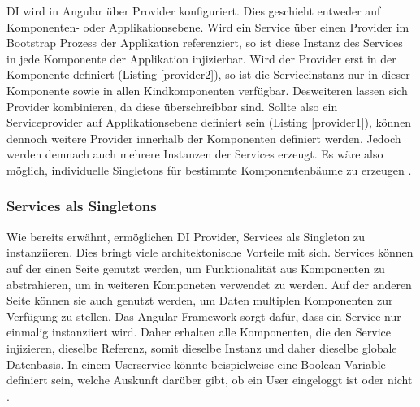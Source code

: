 \ac{DI} wird in Angular über Provider konfiguriert.
Dies geschieht entweder auf Komponenten- oder Applikationsebene.
Wird ein Service über einen Provider im Bootstrap Prozess der Applikation referenziert,
so ist diese Instanz des Services in jede Komponente der Applikation injizierbar.
Wird der Provider erst in der Komponente definiert (Listing \ref{provider2}), so ist die Serviceinstanz nur in dieser Komponente sowie in
allen Kindkomponenten verfügbar. Desweiteren lassen sich Provider kombinieren, da diese überschreibbar sind.
Sollte also ein Serviceprovider auf Applikationsebene definiert sein (Listing \ref{provider1}), können dennoch weitere Provider innerhalb der Komponenten definiert werden.
Jedoch werden demnach auch mehrere Instanzen der Services erzeugt.
Es wäre also möglich, individuelle Singletons für bestimmte Komponentenbäume zu erzeugen \cite[286]{Angular2}.

\vspace{0.2cm}

\vspace{0.2cm}

\vspace{0.2cm}

\vspace{0.2cm}


\subsubsection{Services als Singletons}
\label{Services-als-Singletons}

Wie bereits erwähnt, ermöglichen \ac{DI} Provider, Services als Singleton zu instanziieren.
Dies bringt viele architektonische Vorteile mit sich. Services können auf der einen Seite genutzt werden,
um Funktionalität aus Komponenten zu abstrahieren, um in weiteren Komponeten verwendet zu werden.
Auf der anderen Seite können sie auch genutzt werden, um Daten multiplen Komponenten zur Verfügung zu stellen.
Das Angular Framework sorgt dafür, dass ein Service nur einmalig instanziiert wird. Daher erhalten alle
Komponenten, die den Service injizieren, dieselbe Referenz, somit dieselbe Instanz und daher dieselbe globale Datenbasis.
In einem Userservice könnte beispielweise eine Boolean Variable definiert sein, welche Auskunft darüber gibt,
ob ein User eingeloggt ist oder nicht \cite[308]{Angular2}.


